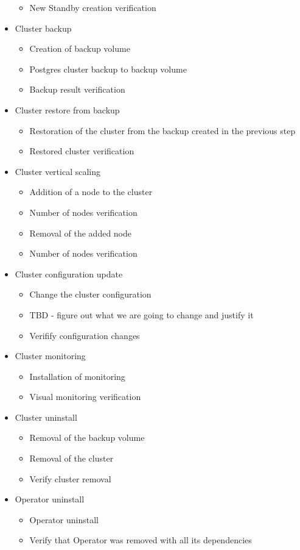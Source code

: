 \begin{itemize}
\begin{itemize}
          \item New Standby creation verification
        \end{itemize}
  \item Cluster backup
        \begin{itemize}
          \item Creation of backup volume
          \item Postgres cluster backup to backup volume
          \item Backup result verification
        \end{itemize}
  \item Cluster restore from backup
        \begin{itemize}
          \item Restoration of the cluster from the backup created in the previous step
          \item Restored cluster verification
        \end{itemize}
  \item Cluster vertical scaling
        \begin{itemize}
          \item Addition of a node to the cluster
          \item Number of nodes verification
          \item Removal of the added node
          \item Number of nodes verification
        \end{itemize}
  \item Cluster configuration update
        \begin{itemize}
          \item Change the cluster configuration
          \item TBD - figure out what we are going to change and justify it
          \item Verifify configuration changes
        \end{itemize}
  \item Cluster monitoring
        \begin{itemize}
          \item Installation of monitoring
          \item Visual monitoring verification
        \end{itemize}
  \item Cluster uninstall
        \begin{itemize}
          \item Removal of the backup volume
          \item Removal of the cluster
          \item Verify cluster removal
        \end{itemize}
  \item Operator uninstall
        \begin{itemize}
          \item Operator uninstall
          \item Verify that Operator was removed with all its dependencies
        \end{itemize}
\end{itemize}


